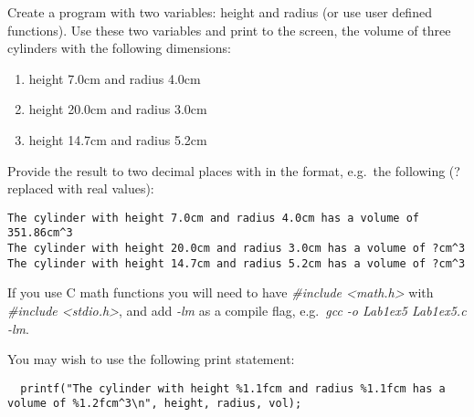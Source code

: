 \documentclass[12pt, a4paper, oneside]{article}
\newcounter{qstncntr}
\newenvironment{exer}[1]{\vspace*{11pt}\noindent {{\bf Exercise} \stepcounter{qstncntr} \theqstncntr:} #1}{}
\begin{document}
\begin{exer}
  Create a program with two variables: height and radius (or use user defined functions). Use these two variables and print to the screen, the volume of three cylinders with the following dimensions:
  \begin{enumerate}
  \item height 7.0cm and radius 4.0cm
  \item height 20.0cm and radius 3.0cm
  \item height 14.7cm and radius 5.2cm
  \end{enumerate}
  Provide the result to two decimal places with in the format, e.g.\ the following (? replaced with real values):
\begin{verbatim}
The cylinder with height 7.0cm and radius 4.0cm has a volume of 351.86cm^3
The cylinder with height 20.0cm and radius 3.0cm has a volume of ?cm^3
The cylinder with height 14.7cm and radius 5.2cm has a volume of ?cm^3
\end{verbatim}

  If you use C math functions you will need to have \emph{\#include <math.h>} with \emph{\#include <stdio.h>}, and add \emph{-lm} as a compile flag, e.g.\ \emph{gcc -o Lab1ex5 Lab1ex5.c -lm}.

%


You may wish to use the following print statement:

\tiny
\begin{verbatim}
  printf("The cylinder with height %1.1fcm and radius %1.1fcm has a volume of %1.2fcm^3\n", height, radius, vol);
\end{verbatim}
\end{exer}
\end{document}
